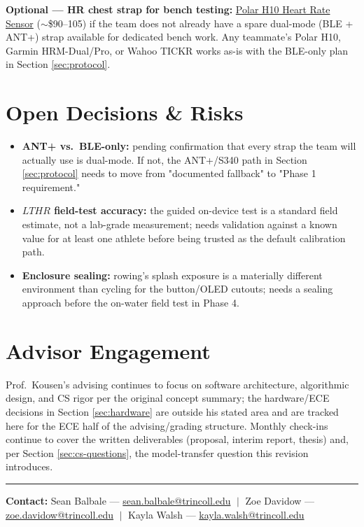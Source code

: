 \documentclass[11pt, letterpaper]{article}
\begin{document}
\textbf{Optional --- HR chest strap for bench testing:}
\href{https://www.polar.com/us-en/sensors/h10-heart-rate-sensor}{Polar H10 Heart Rate Sensor}
($\sim$\$90--105) if the team does not already have a spare dual-mode (BLE + ANT+) strap
available for dedicated bench work. Any teammate's Polar H10, Garmin HRM-Dual/Pro, or Wahoo
TICKR works as-is with the BLE-only plan in Section \ref{sec:protocol}.

\section{Open Decisions \& Risks}
\label{sec:risks}

\begin{itemize}
  \item \textbf{ANT+ vs.\ BLE-only:} pending confirmation that every strap the team will
    actually use is dual-mode. If not, the ANT+/S340 path in Section \ref{sec:protocol} needs
    to move from "documented fallback" to "Phase 1 requirement."
  \item \textbf{$LTHR$ field-test accuracy:} the guided on-device test is a standard field
    estimate, not a lab-grade measurement; needs validation against a known value for at least
    one athlete before being trusted as the default calibration path.
  \item \textbf{Enclosure sealing:} rowing's splash exposure is a materially different
    environment than cycling for the button/OLED cutouts; needs a sealing approach before the
    on-water field test in Phase 4.
\end{itemize}

\section{Advisor Engagement}

Prof.\ Kousen's advising continues to focus on software architecture, algorithmic design, and
CS rigor per the original concept summary; the hardware/ECE decisions in Section \ref{sec:hardware} are outside
his stated area and are tracked here for the ECE half of the advising/grading structure. Monthly
check-ins continue to cover the written deliverables (proposal, interim report, thesis) and, per
Section \ref{sec:cs-questions}, the model-transfer question this revision introduces.

\vspace{1em}
\noindent\rule{\linewidth}{0.5pt}
\vspace{0.2em}
{\small
  \noindent \textbf{Contact:}\;
  Sean Balbale ---
  \href{mailto:sean.balbale@trincoll.edu}{sean.balbale@trincoll.edu}
  $\;\big|\;$
  Zoe Davidow ---
  \href{mailto:zoe.davidow@trincoll.edu}{zoe.davidow@trincoll.edu}
  $\;\big|\;$
  Kayla Walsh ---
  \href{mailto:kayla.walsh@trincoll.edu}{kayla.walsh@trincoll.edu}
}
\end{document}
